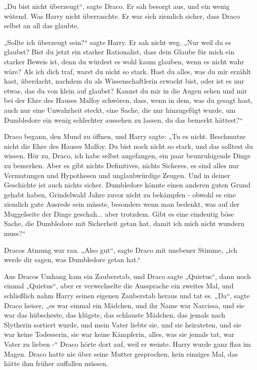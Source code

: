 {„Du bist nicht überzeugt“, sagte Draco. Er sah besorgt aus, und ein wenig wütend. Was Harry nicht überraschte. Er war sich ziemlich sicher, dass Draco selbst an all das glaubte.

„Sollte ich überzeugt sein?“ sagte Harry. Er sah nicht weg. „Nur weil du es glaubst? Bist du jetzt ein starker Rationalist, dass dein Glaube für mich ein starker Beweis ist, denn du würdest es wohl kaum glauben, wenn es nicht wahr wäre? Als ich dich traf, warst du nicht so stark. Hast du alles, was du mir erzählt hast, überdacht, nachdem du als Wissenschaftlerin erwacht bist, oder ist es nur etwas, das du von klein auf glaubst? Kannst du mir in die Augen sehen und mir bei der Ehre des Hauses Malfoy schwören, dass, wenn in dem, was du gesagt hast, auch nur eine Unwahrheit steckt, eine Sache, die nur hinzugefügt wurde, um Dumbledore ein wenig schlechter aussehen zu lassen, du das bemerkt hättest?“

Draco begann, den Mund zu öffnen, und Harry sagte: „Tu es nicht. Beschmutze nicht die Ehre des Hauses Malfoy. Du bist noch nicht so stark, und das solltest du wissen. Hör zu, Draco, ich habe selbst angefangen, ein paar beunruhigende Dinge zu bemerken. Aber es gibt nichts Definitives, nichts Sicheres, es sind alles nur Vermutungen und Hypothesen und unglaubwürdige Zeugen. Und in deiner Geschichte ist auch nichts sicher. Dumbledore könnte einen anderen guten Grund gehabt haben, Grindelwald Jahre zuvor nicht zu bekämpfen - obwohl es eine ziemlich gute Ausrede sein müsste, besonders wenn man bedenkt, was auf der Muggelseite der Dinge geschah... aber trotzdem. Gibt es eine eindeutig böse Sache, die Dumbledore mit Sicherheit getan hat, damit ich mich nicht wundern muss?“

Dracos Atmung war rau. „Also gut“, sagte Draco mit unebener Stimme, „ich werde dir sagen, was Dumbledore getan hat.“

Aus Dracos Umhang kam ein Zauberstab, und Draco sagte „Quietus“, dann noch einmal „Quietus“, aber er verwechselte die Aussprache ein zweites Mal, und schließlich nahm Harry seinen eigenen Zauberstab heraus und tat es. „Da“, sagte Draco heiser, „es war einmal ein Mädchen, und ihr Name war Narcissa, und sie war das hübscheste, das klügste, das schlauste Mädchen, das jemals nach Slytherin sortiert wurde, und mein Vater liebte sie, und sie heirateten, und sie war keine Todesserin, sie war keine Kämpferin, alles, was sie jemals tat, war Vater zu lieben -“ Draco hörte dort auf, weil er weinte. Harry wurde ganz flau im Magen. Draco hatte nie über seine Mutter gesprochen, kein einziges Mal, das hätte ihm früher auffallen müssen.

}

